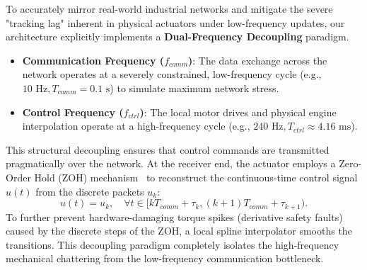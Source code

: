 To accurately mirror real-world industrial networks and mitigate the severe "tracking lag" inherent in physical actuators under low-frequency updates, our architecture explicitly implements a \textbf{Dual-Frequency Decoupling} paradigm. 
\begin{itemize}
    \item \textbf{Communication Frequency ($f_{comm}$)}: The data exchange across the network operates at a severely constrained, low-frequency cycle (e.g., $10 \text{ Hz}, T_{comm} = 0.1 \text{ s}$) to simulate maximum network stress.
    \item \textbf{Control Frequency ($f_{ctrl}$)}: The local motor drives and physical engine interpolation operate at a high-frequency cycle (e.g., $240 \text{ Hz}, T_{ctrl} \approx 4.16 \text{ ms}$).
\end{itemize}
This structural decoupling ensures that control commands are transmitted pragmatically over the network. At the receiver end, the actuator employs a Zero-Order Hold (ZOH) mechanism~\cite{CCSTD,SNCS} to reconstruct the continuous-time control signal $u(t)$ from the discrete packets $u_k$:
\begin{equation}
    u(t) = u_k, \quad \forall t \in [k T_{comm} + \tau_k, (k+1) T_{comm} + \tau_{k+1}).
\end{equation}
To further prevent hardware-damaging torque spikes (derivative safety faults) caused by the discrete steps of the ZOH, a local spline interpolator smooths the transitions. This decoupling paradigm completely isolates the high-frequency mechanical chattering from the low-frequency communication bottleneck.

